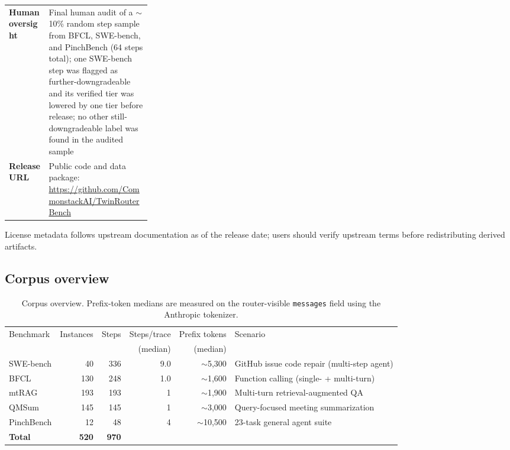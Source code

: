 \begin{table}[ht]
\begin{tabularx}{\linewidth}{p{0.28\linewidth} X}
\textbf{Human oversight} & Final human audit of a $\sim$10\% random step sample from BFCL, SWE-bench, and PinchBench (64 steps total); one SWE-bench step was flagged as further-downgradeable and its verified tier was lowered by one tier before release; no other still-downgradeable label was found in the audited sample \\
\textbf{Release URL} & Public code and data package: \url{https://github.com/CommonstackAI/TwinRouterBench} \\
\bottomrule
\end{tabularx}
\end{table}

License metadata follows upstream documentation as of the release date; users
should verify upstream terms before redistributing derived artifacts.

\subsection{Corpus overview}
\label{app:corpus-overview}

\begin{table}[ht]
\centering
\small
\begin{adjustbox}{max width=\linewidth}
\begin{tabular}{lrrrrl}
\toprule
Benchmark & Instances & Steps & Steps/trace & Prefix tokens & Scenario \\
 & & & (median) & (median) & \\
\midrule
SWE-bench      & 40  & 336 & 9.0 & $\sim$5{,}300 & GitHub issue code repair (multi-step agent) \\
BFCL           & 130 & 248 & 1.0 & $\sim$1{,}600 & Function calling (single- + multi-turn) \\
mtRAG          & 193 & 193 & 1   & $\sim$1{,}900 & Multi-turn retrieval-augmented QA \\
QMSum          & 145 & 145 & 1   & $\sim$3{,}000 & Query-focused meeting summarization \\
PinchBench     & 12  & 48  & 4   & $\sim$10{,}500 & 23-task general agent suite \\
\midrule
\textbf{Total} & \textbf{520} & \textbf{970} & & & \\
\bottomrule
\end{tabular}
\end{adjustbox}
\caption{Corpus overview. Prefix-token medians are measured on the router-visible \texttt{messages} field using the Anthropic tokenizer.}
\label{tab:corpus-overview}
\end{table}

